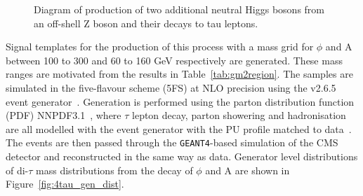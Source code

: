 \begin{figure}[H]
\centering
{}
\vspace*{10mm}
\caption{Diagram of production of two additional neutral Higgs bosons from an off-shell Z boson and their decays to tau leptons.}
\label{fig:4tau_feynamn}
\end{figure}

Signal templates for the production of this process with a mass grid for $\phi$ and A between 100 to 300 and 60 to 160 GeV respectively are generated.
These mass ranges are motivated from the results in Table~\ref{tab:gm2region}.
The samples are simulated in the five-flavour scheme (5FS) at NLO precision using the \MGvATNLO v2.6.5 event generator~\cite{Alwall:2011uj}.
Generation is performed using the parton distribution function (PDF) NNPDF3.1~\cite{Ball:2014uwa,Ball:2017nwa}, where $\tau$ lepton decay, parton showering and hadronisation are all modelled with the \PYTHIA event generator with the PU profile matched to data~\cite{Sirunyan:2019dfx,Sjostrand:2014zea}.
The events are then passed through the \texttt{GEANT4}-based \cite{Agostinelli:2002hh} simulation of the CMS detector and reconstructed in the same way as data.
Generator level distributions of di-$\tau$ mass distributions from the decay of $\phi$ and A are shown in Figure~\ref{fig:4tau_gen_dist}.\\

